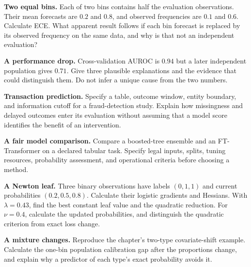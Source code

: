 \begin{exercises}
\item \textbf{Two equal bins.} Each of two bins contains half the evaluation observations. Their mean forecasts are $0.2$ and $0.8$, and observed frequencies are $0.1$ and $0.6$. Calculate ECE. What apparent result follows if each bin forecast is replaced by its observed frequency on the same data, and why is that not an independent evaluation?
\item \textbf{A performance drop.} Cross-validation AUROC is $0.94$ but a later independent population gives $0.71$. Give three plausible explanations and the evidence that could distinguish them. Do not infer a unique cause from the two numbers.
\item \textbf{Transaction prediction.} Specify a table, outcome window, entity boundary, and information cutoff for a fraud-detection study. Explain how missingness and delayed outcomes enter its evaluation without assuming that a model score identifies the benefit of an intervention.
\item \textbf{A fair model comparison.} Compare a boosted-tree ensemble and an FT-Transformer on a declared tabular task. Specify legal inputs, splits, tuning resources, probability assessment, and operational criteria before choosing a method.
\item \textbf{A Newton leaf.} Three binary observations have labels $(0,1,1)$ and current probabilities $(0.2,0.5,0.8)$. Calculate their logistic gradients and Hessians. With $\lambda=0.43$, find the best constant leaf value and the quadratic reduction. For $\nu=0.4$, calculate the updated probabilities, and distinguish the quadratic criterion from exact loss change.
\item \textbf{A mixture changes.} Reproduce the chapter's two-type covariate-shift example. Calculate the one-bin population calibration gap after the proportions change, and explain why a predictor of each type's exact probability avoids it.
\end{exercises}

